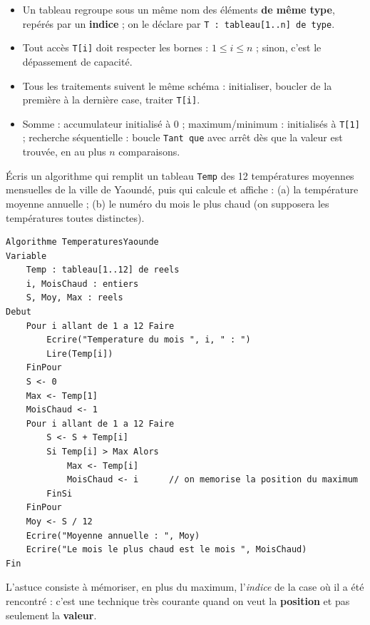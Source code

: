 \documentclass[11pt]{article}
\begin{document}
\begin{aretenir}
\begin{itemize}
\item Un tableau regroupe sous un même nom des éléments \textbf{de même type}, repérés par un \textbf{indice} ; on le déclare par \texttt{T : tableau[1..n] de type}.
\item Tout accès \texttt{T[i]} doit respecter les bornes : $1 \le i \le n$ ; sinon, c'est le dépassement de capacité.
\item Tous les traitements suivent le même schéma : initialiser, boucler de la première à la dernière case, traiter \texttt{T[i]}.
\item Somme : accumulateur initialisé à 0 ; maximum/minimum : initialisés à \texttt{T[1]} ; recherche séquentielle : boucle \texttt{Tant que} avec arrêt dès que la valeur est trouvée, en au plus $n$ comparaisons.
\end{itemize}
\end{aretenir}

\begin{exercice}
Écris un algorithme qui remplit un tableau \texttt{Temp} des 12 températures moyennes mensuelles de la ville de Yaoundé, puis qui calcule et affiche : (a) la température moyenne annuelle ; (b) le numéro du mois le plus chaud (on supposera les températures toutes distinctes).
\end{exercice}

\begin{corrige}[Exercice 1]
\begin{lstlisting}
Algorithme TemperaturesYaounde
Variable
    Temp : tableau[1..12] de reels
    i, MoisChaud : entiers
    S, Moy, Max : reels
Debut
    Pour i allant de 1 a 12 Faire
        Ecrire("Temperature du mois ", i, " : ")
        Lire(Temp[i])
    FinPour
    S <- 0
    Max <- Temp[1]
    MoisChaud <- 1
    Pour i allant de 1 a 12 Faire
        S <- S + Temp[i]
        Si Temp[i] > Max Alors
            Max <- Temp[i]
            MoisChaud <- i      // on memorise la position du maximum
        FinSi
    FinPour
    Moy <- S / 12
    Ecrire("Moyenne annuelle : ", Moy)
    Ecrire("Le mois le plus chaud est le mois ", MoisChaud)
Fin
\end{lstlisting}
L'astuce consiste à mémoriser, en plus du maximum, l'\emph{indice} de la case où il a été rencontré : c'est une technique très courante quand on veut la \textbf{position} et pas seulement la \textbf{valeur}.
\end{corrige}
\end{document}
